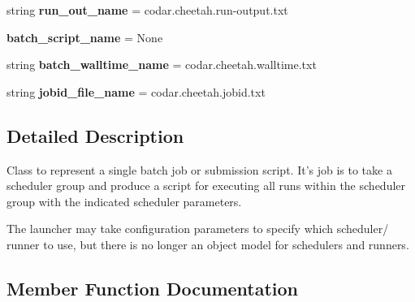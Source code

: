 \begin{DoxyCompactItemize}
\item 
\mbox{\label{classcodar_1_1cheetah_1_1launchers_1_1_launcher_a177b178c57aa1f5862b5ce57a7f357d6}} 
string {\bfseries run\+\_\+out\+\_\+name} = \textquotesingle{}codar.\+cheetah.\+run-\/output.\+txt\textquotesingle{}
\item 
\mbox{\label{classcodar_1_1cheetah_1_1launchers_1_1_launcher_af55f3a888f545826d771f3679152da47}} 
{\bfseries batch\+\_\+script\+\_\+name} = None
\item 
\mbox{\label{classcodar_1_1cheetah_1_1launchers_1_1_launcher_abfcb19cb3d329c4ea0f362667f70df2f}} 
string {\bfseries batch\+\_\+walltime\+\_\+name} = \textquotesingle{}codar.\+cheetah.\+walltime.\+txt\textquotesingle{}
\item 
\mbox{\label{classcodar_1_1cheetah_1_1launchers_1_1_launcher_a25b770312bca1ca9b0deefa1faf89c06}} 
string {\bfseries jobid\+\_\+file\+\_\+name} = \textquotesingle{}codar.\+cheetah.\+jobid.\+txt\textquotesingle{}
\end{DoxyCompactItemize}


\subsection{Detailed Description}
\begin{DoxyVerb}Class to represent a single batch job or submission script.
It's job is to take a scheduler group and produce a script for executing
all runs within the scheduler group with the indicated scheduler
parameters.

The launcher may take configuration parameters to specify which scheduler/
runner to use, but there is no longer an object model for schedulers and
runners.
\end{DoxyVerb}
 

\subsection{Member Function Documentation}
\mbox{\label{classcodar_1_1cheetah_1_1launchers_1_1_launcher_a961dc12bab6b346c28372995b9873e46}} 
